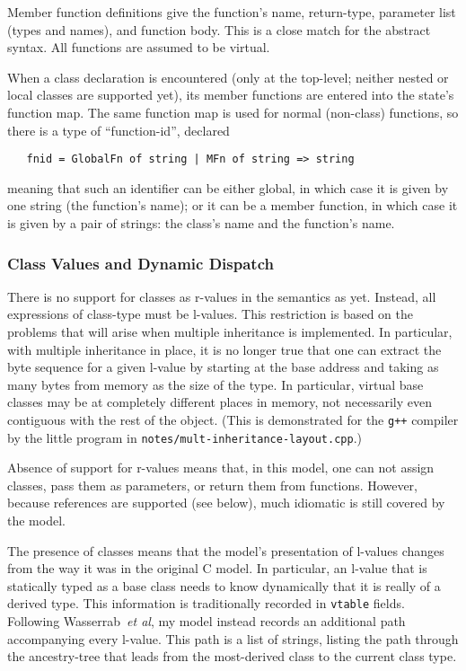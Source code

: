 \documentclass[11pt]{article}
\begin{document}
Member function definitions give the function's name, return-type,
parameter list (types and names), and function body.  This is a close
match for the abstract syntax.  All functions are assumed to be
virtual.

When a class declaration is encountered (only at the top-level;
neither nested or local classes are supported yet), its member
functions are entered into the state's function map.  The same
function map is used for normal (non-class) functions, so there is a
type of ``function-id'', declared
\begin{verbatim}
   fnid = GlobalFn of string | MFn of string => string
\end{verbatim}
meaning that such an identifier can be either global, in which case it
is given by one string (the function's name); or it can be a member
function, in which case it is given by a pair of strings: the class's
name and the function's name.

\subsubsection{Class Values and Dynamic Dispatch}
\label{sec:class-values}
There is no support for classes as r-values in the semantics as yet.
Instead, all expressions of class-type must be l-values.  This
restriction is based on the problems that will arise when multiple
inheritance is implemented.  In particular, with multiple inheritance
in place, it is no longer true that one can extract the byte sequence
for a given l-value by starting at the base address and taking as many
bytes from memory as the size of the type.  In particular, virtual
base classes may be at completely different places in memory, not
necessarily even contiguous with the rest of the object.  (This is
demonstrated for the \texttt{g++} compiler by the little program in
\texttt{notes/mult-inheritance-layout.cpp}.)

Absence of support for r-values means that, in this model, one can not
assign classes, pass them as parameters, or return them from
functions.  However, because references are supported (see below),
much idiomatic \cpp{} is still covered by the model.

The presence of classes means that the model's presentation of
l-values changes from the way it was in the original C model.  In
particular, an l-value that is statically typed as a base class needs
to know dynamically that it is really of a derived type.  This
information is traditionally recorded in \texttt{vtable} fields.
Following Wasserrab~\emph{et al}, my model instead records an
additional path accompanying every l-value.  This path is a list of
strings, listing the path through the ancestry-tree that leads from
the most-derived class to the current class type.
\end{document}
